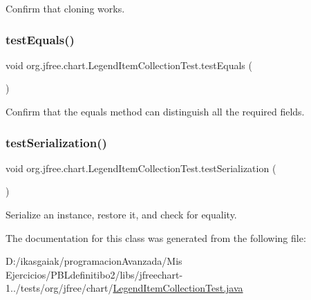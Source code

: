 Confirm that cloning works. \mbox{\label{classorg_1_1jfree_1_1chart_1_1_legend_item_collection_test_a6e9ab12a2a16693ae01642cdbfe6257b}} 
\subsubsection{\texorpdfstring{test\+Equals()}{testEquals()}}
{\footnotesize\ttfamily void org.\+jfree.\+chart.\+Legend\+Item\+Collection\+Test.\+test\+Equals (\begin{DoxyParamCaption}{ }\end{DoxyParamCaption})}

Confirm that the equals method can distinguish all the required fields. \mbox{\label{classorg_1_1jfree_1_1chart_1_1_legend_item_collection_test_a158032f47fd0711ba001b83009aa7ea6}} 
\subsubsection{\texorpdfstring{test\+Serialization()}{testSerialization()}}
{\footnotesize\ttfamily void org.\+jfree.\+chart.\+Legend\+Item\+Collection\+Test.\+test\+Serialization (\begin{DoxyParamCaption}{ }\end{DoxyParamCaption})}

Serialize an instance, restore it, and check for equality. 

The documentation for this class was generated from the following file\+:\begin{DoxyCompactItemize}
\item 
D\+:/ikasgaiak/programacion\+Avanzada/\+Mis Ejercicios/\+P\+B\+Ldefinitibo2/libs/jfreechart-\/1../tests/org/jfree/chart/\mbox{\hyperlink{_legend_item_collection_test_8java}{Legend\+Item\+Collection\+Test.\+java}}\end{DoxyCompactItemize}

